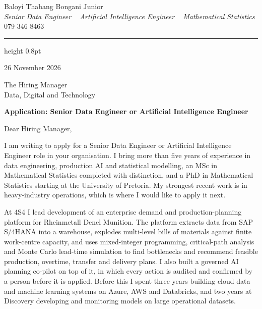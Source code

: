 \documentclass[a4paper,11pt]{article}
\begin{document}
\begin{center}
    {\huge Baloyi Thabang Bongani Junior} \\ \vspace{2pt}
    {\large\textit{Senior Data Engineer \textbar~ Artificial Intelligence Engineer \textbar~ Mathematical Statistics}} \\ \vspace{4pt}
    {079 346 8463} ~\textbar~
    \href{mailto:Baloyibongani1@gmail.com}{\color{blue}{Baloyibongani1@gmail.com}} ~\textbar~
    \href{https://www.linkedin.com/in/thabang-bongani-junior-baloyi-2622b0286/}{\color{blue}{LinkedIn}} ~\textbar~
    \href{https://github.com/thabangTheActuaryCoder}{\color{blue}{GitHub}}
\end{center}
{\color{airforceblue}\hrule height 0.8pt}

\vspace{6pt}
26 November 2026

The Hiring Manager \\
Data, Digital and Technology

\textbf{Application: Senior Data Engineer or Artificial Intelligence Engineer}

Dear Hiring Manager,

I am writing to apply for a Senior Data Engineer or Artificial Intelligence Engineer role in your
organisation. I bring more than five years of experience in data engineering, production AI and
statistical modelling, an MSc in Mathematical Statistics completed with distinction, and a PhD in
Mathematical Statistics starting at the University of Pretoria. My strongest recent work is in
heavy-industry operations, which is where I would like to apply it next.

At 4S4 I lead development of an enterprise demand and production-planning platform for Rheinmetall
Denel Munition. The platform extracts data from SAP S/4HANA into a warehouse, explodes multi-level
bills of materials against finite work-centre capacity, and uses mixed-integer programming,
critical-path analysis and Monte Carlo lead-time simulation to find bottlenecks and recommend feasible
production, overtime, transfer and delivery plans. I also built a governed AI planning co-pilot on top
of it, in which every action is audited and confirmed by a person before it is applied. Before this I
spent three years building cloud data and machine learning systems on Azure, AWS and Databricks, and
two years at Discovery developing and monitoring models on large operational datasets.
\end{document}
